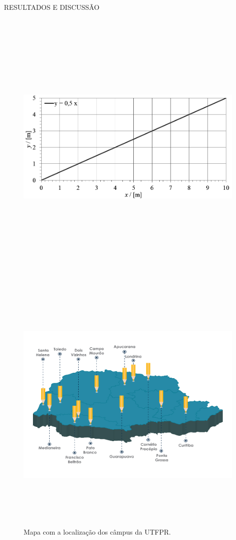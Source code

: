 \documentclass[%
  final,%
  english,%
  brazilian,%
]{beamer}
\begin{document}
\begin{frame}[t, fragile = singleslide]
\begin{columns}[t, onlytextwidth]
\begin{column}{\textwidth}
\begin{block}{RESULTADOS E DISCUSSÃO}
\begin{column}[T]{0.33\textwidth}
\begin{figure}[!htb]
\includegraphics[height = 130mm]{./Figuras/graficoxy}
\end{figure}
\end{column}
\yellowvrule%
\begin{column}[T]{0.33\textwidth}
\begin{figure}[!htb]
\centering%
\caption{Mapa com a localização dos câmpus da UTFPR.}%
\label{fig:mapacampus}
\includegraphics[height = 130mm]{./Figuras/mapacampus}

\end{figure}
\end{column}
\end{block}
\end{column}
\end{columns}
\end{frame}
\end{document}
